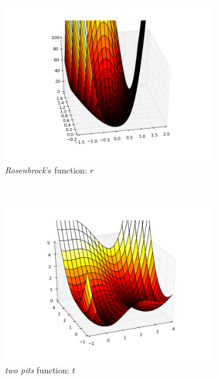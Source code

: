 \documentclass[a4paper,twoside,10pt]{amsart}
\numberwithin{equation}{section} %
\numberwithin{figure}{section} %
\numberwithin{table}{section} %
\theoremstyle{definition}
\begin{document}
\begin{figure}[h!]
\begin{subfigure}[b]{0.48\textwidth}
        \centering
        \includegraphics[width=1.0\textwidth]{rosenbrock.png}
        \caption{\emph{Rosenbrock}'s function: $r$}
    \end{subfigure}
    ~ 
    \begin{subfigure}[b]{0.48\textwidth}
        \centering
        \includegraphics[width=1.0\textwidth]{two_pits.png}
        \caption{\emph{two pits} function: $t$}
    \end{subfigure}
    ~ 
    \begin{subfigure}[b]{0.48\textwidth}
        \centering

\end{subfigure}
\end{figure}
\end{document}
